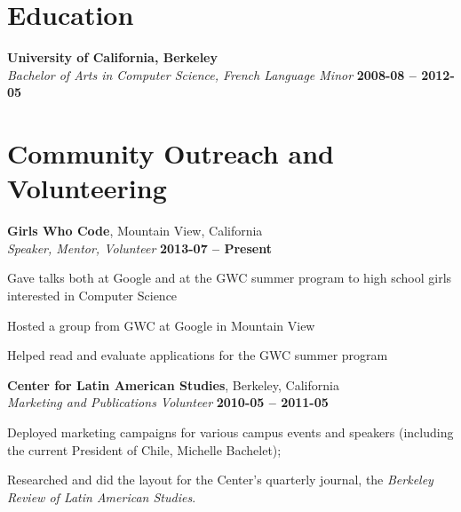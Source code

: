 \documentclass[margin,line]{resume}
\begin{document}
\begin{resume}
    \section{\mysidestyle Education}

    \textbf{University of California, Berkeley}\vspace{1mm}\\\vspace{0mm}%
    \setlength{\leftmargin}{0.25in}
    \textsl{Bachelor of Arts in Computer Science, French Language Minor} \hfill \textbf{2008-08 -- 2012-05} \vspace{-1.5mm}

	\section{\mysidestyle Community Outreach and Volunteering}

  \textbf{Girls Who Code}, Mountain View, California \vspace{1mm}\\\vspace{0mm}%
  \textsl{Speaker, Mentor, Volunteer} \hfill \textbf{2013-07 -- Present}\vspace{0mm}\vspace{0mm}%
  \begin{list2}
    \item Gave talks both at Google and at the GWC summer program to high school girls interested in Computer Science
    \item Hosted a group from GWC at Google in Mountain View
    \item Helped read and evaluate applications for the GWC summer program
  \end{list2}

	\textbf{Center for Latin American Studies}, Berkeley, California \vspace{1mm}\\\vspace{0mm}%
    \textsl{Marketing and Publications Volunteer} \hfill \textbf{2010-05 -- 2011-05}\vspace{0mm}\vspace{0mm}%
	\begin{list2}
		\item Deployed marketing campaigns for various campus events and speakers (including the current President of Chile, Michelle Bachelet);
		\item Researched and did the layout for the Center's quarterly journal, the \emph{Berkeley Review of
	Latin American Studies}.
	\end{list2}


\end{resume}
\end{document}
